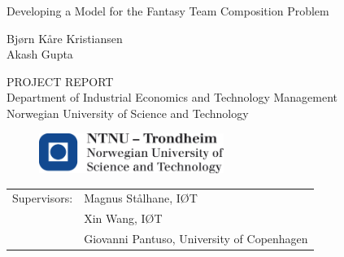 \vspace*{7cm}


\begin{center}{\vspace{-7cm}}
{\Huge Developing a Model for the Fantasy Team Composition Problem}
\end{center}
\vspace*{7cm}

\begin{center}{\vspace{-4cm}}
{\Large Bj\o rn K\aa re Kristiansen} \\ 
{\Large Akash Gupta} 
\end{center}

\begin{center}{\vspace{2cm}}
   PROJECT REPORT \\ 
   Department of Industrial Economics and Technology Management\\
Norwegian University of Science and Technology
\end{center}

\begin{figure}[H]{\vspace{0.5cm}}
    \centering
    \includegraphics[width = 60mm,scale=0.5]{fig/ntnu_logo.png}
\end{figure}


\begin{table}[b]
    \begin{tabular}{ll}
       Supervisors:  & Magnus St\aa lhane, I\O T \\ 
                     & Xin Wang, I\O T \\
                     & Giovanni Pantuso, University of Copenhagen \\ 
    \end{tabular}
\end{table}

\cleardoublepage